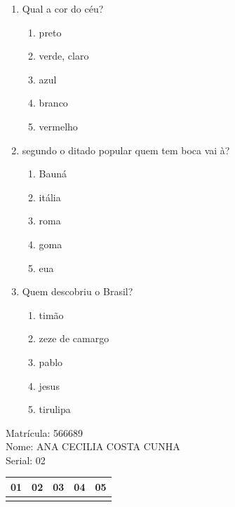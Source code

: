 \documentclass[10pt,a4paper,twocolumn]{report}
\begin{document}
 \begin{enumerate} 
    \item  Qual a cor do céu?





    \begin{enumerate}
    \item  preto

\item  verde, claro

\item  azul

\item  branco

\item  vermelho


    \end{enumerate} 
    \item  segundo o ditado popular quem tem boca vai à?





    \begin{enumerate}
    \item  Bauná

\item  itália

\item  roma

\item  goma

\item  eua


    \end{enumerate} 
    \item  Quem descobriu o Brasil?





    \begin{enumerate}
    \item  timão

\item  zeze de camargo

\item  pablo

\item  jesus

\item  tirulipa


    \end{enumerate}\end{enumerate} 
Matrícula: 566689\\ Nome: ANA CECILIA COSTA CUNHA \\ Serial: 02\\
\begin{tabular}{|l|l|l|l|l|}\hline
01  &02  &03  &04  &05 \\ \hline 
 & & & & \\ \hline 
\end{tabular}
 \cleardoublepage 
\end{document}
